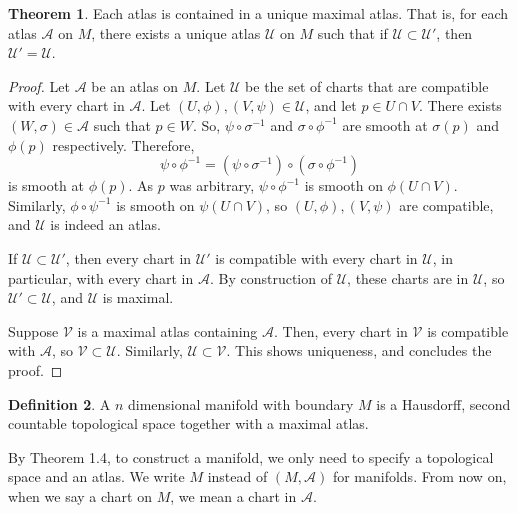 \documentclass[]{article}
\theoremstyle{definition}
\newtheorem{theorem}{Theorem}[section] %
\theoremstyle{definition}
\newtheorem{definition}[theorem]{Definition} %
\begin{document}
\begin{theorem}
    Each atlas is contained in a unique maximal atlas. That is, for each atlas $\mathcal{A}$ on $M$, there exists a unique atlas $\mathcal{U}$ on $M$ such that if $\mathcal{U}\subset\mathcal{U}'$, then $\mathcal{U}'=\mathcal{U}$.
\end{theorem}

\begin{proof}
    Let $\mathcal{A}$ be an atlas on $M$. Let $\mathcal{U}$ be the set of charts that are compatible with every chart in $\mathcal{A}$. Let $(U, \phi), (V, \psi)\in \mathcal{U}$, and let $p\in U\cap V$. There exists $(W, \sigma)\in \mathcal{A}$ such that $p\in W$. So, $\psi\circ\sigma^{-1}$ and $\sigma\circ\phi^{-1}$ are smooth at $\sigma(p)$ and $\phi(p)$ respectively. Therefore, \[\psi\circ\phi^{-1} = (\psi\circ\sigma^{-1})\circ(\sigma\circ\phi^{-1})\] is smooth at $\phi(p)$. As $p$ was arbitrary, $\psi\circ\phi^{-1}$ is smooth on $\phi(U\cap V)$. Similarly, $\phi\circ\psi^{-1}$ is smooth on $\psi(U\cap V)$, so $(U, \phi), (V, \psi)$ are compatible, and $\mathcal{U}$ is indeed an atlas.
    
    If $\mathcal{U}\subset \mathcal{U}'$, then every chart in $\mathcal{U}'$ is compatible with every chart in $\mathcal{U}$, in particular, with every chart in $\mathcal{A}$. By construction of $\mathcal{U}$, these charts are in $\mathcal{U}$, so $\mathcal{U}'\subset \mathcal{U}$, and $\mathcal{U}$ is maximal.

    Suppose $\mathcal{V}$ is a maximal atlas containing $\mathcal{A}$. Then, every chart in $\mathcal{V}$ is compatible with $\mathcal{A}$, so $\mathcal{V}\subset \mathcal{U}$. Similarly, $\mathcal{U}\subset \mathcal{V}$. This shows uniqueness, and concludes the proof.
\end{proof}

\begin{definition}
    A $n$ dimensional manifold with boundary $M$ is a Hausdorff, second countable topological space together with a maximal atlas.
\end{definition}

By Theorem 1.4, to construct a manifold, we only need to specify a topological space and an atlas. We write $M$ instead of $(M, \mathcal{A})$ for manifolds. From now on, when we say a chart on $M$, we mean a chart in $\mathcal{A}$.
\end{document}

